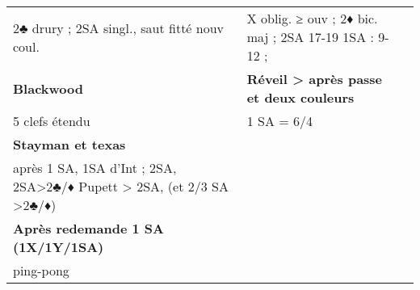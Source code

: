 \documentclass[a4paper]{article}
\def\size{}
\newcommand{\g}[1]{\textbf{#1}}
\begin{document}
{{\begin{tabular}{p{}|p{}|p{}}
	2♣ drury  ; 2SA singl., saut fitté nouv coul. & X oblig. ≥ ouv  ; 2♦ bic. maj ; 2SA 17-19 1SA : 9-12   ; & \\
	
	\g{Blackwood} & \g{Réveil > après passe et deux couleurs} \\
	
	5 clefs étendu & 1 SA = 6/4							 \\
	
	\g{Stayman et texas} \\
	après 1 SA, 1SA d'Int ; 2SA, 2SA>2♣/♦  Pupett > 2SA, (et 2/3 SA >2♣/♦) \\
	
	\g{Après redemande 1 SA (1X/1Y/1SA)} \\
	 
	ping-pong \\
	\end{tabular}
	}
}


\dolistloop{\size}
\end{document}
